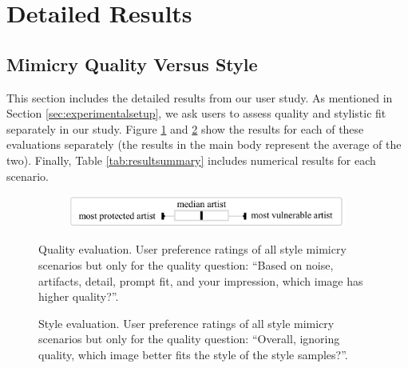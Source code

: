 \documentclass{article}
\begin{document}
\clearpage

\clearpage
\section{Detailed Results}
\label{ap:additionalresults}

\subsection{Mimicry Quality Versus Style}
This section includes the detailed results from our user study. As mentioned in Section \ref{sec:experimentalsetup}, we ask users to assess quality and stylistic fit separately in our study. Figure \ref{fig:quality} and \ref{fig:style} show the results for each of these evaluations separately (the results in the main body represent the average of the two). Finally, Table \ref{tab:resultsummary} includes numerical results for each scenario.

\begin{figure}[h]
    \centering
    \begin{subfigure}{0.5\textwidth}
        \includegraphics[width=\textwidth]{plots/legend.pdf}
    \end{subfigure}
    \hspace*{-3.2cm}
    \begin{subfigure}[t]{\textwidth}
    \end{subfigure}
    \caption{Quality evaluation. User preference ratings of all style mimicry scenarios but only for the quality question: ``Based on noise, artifacts, detail, prompt fit, and your impression, which image has higher quality?''.}
    \label{fig:quality}
\end{figure}

\begin{figure}[h]
    \centering
    \hspace*{-3.2cm}
    \begin{subfigure}[t]{\textwidth}
    \end{subfigure}
    \caption{Style evaluation. User preference ratings of all style mimicry scenarios but only for the quality question: ``Overall, ignoring quality, which image better fits the style of the style samples?''.}
    \label{fig:style}
\end{figure}
\end{document}
